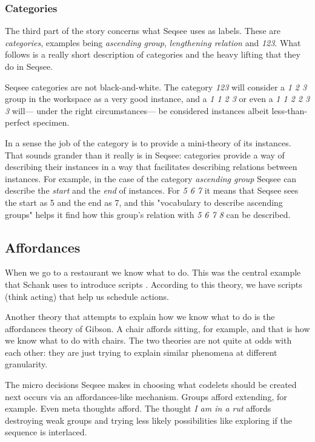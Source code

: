 \documentclass[letterpaper]{article}
\begin{document}
\subsubsection{Categories}
The third part of the story concerns what Seqsee uses as labels.  These are \emph{categories}, examples being \emph{ascending group}, \emph{lengthening relation} and \emph{123}.  What follows is a really short description of categories and the heavy lifting that they do in Seqsee.

Seqsee categories are not black-and-white.  The category \emph{123} will consider a \emph{1 2 3} group in the workspace as a very good instance, and a \emph{1 1 2 3} or even a \emph{1 1 2 2 3 3} will--- under the right circumstances--- be considered instances albeit less-than-perfect specimen.

In a sense the job of the category is to provide a mini-theory of its instances.  That sounds grander than it really is in Seqsee: categories provide a way of describing their instances in a way that facilitates describing relations between instances.  For example, in the case of the category \emph{ascending group} Seqsee can describe the \emph{start} and the \emph{end} of instances.  For \emph{5 6 7} it means that Seqsee sees the start as 5 and the end as 7, and this "vocabulary to describe ascending groups" helps it find how this group's relation with \emph{5 6 7 8} can be described.

\subsection{Affordances}
\label{sec:affordances}

When we go to a restaurant we know what to do.  This was the central example that Schank uses to introduce scripts \cite{Schank+Abelson}.  According to this theory, we have scripts (think acting) that help us schedule actions. 

 Another theory that attempts to explain how we know what to do is the affordances theory of Gibson. A chair affords sitting, for example, and that is how we know what to do with chairs.  The two theories are not quite at odds with each other: they are just trying to explain similar phenomena at different granularity.

The micro decisions Seqsee makes in choosing what codelets should be created next occurs via an affordances-like mechanism. Groups afford extending, for example.  Even meta thoughts afford.  The thought \emph{I am in a rut} affords destroying weak groups and trying less likely possibilities like exploring if the sequence is interlaced.
\end{document}
